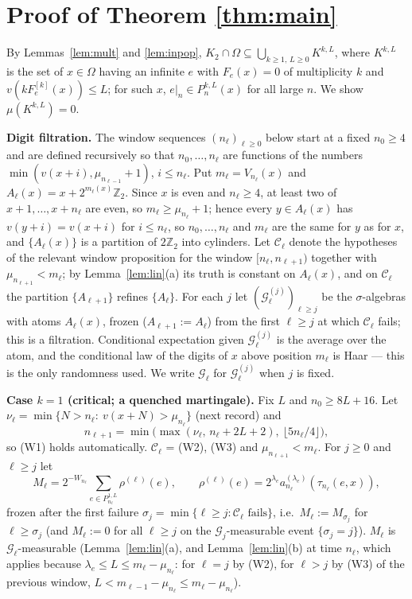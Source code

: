 \documentclass[11pt]{amsart}
\theoremstyle{definition}
\newcommand{\Z}{\mathbb Z}
\begin{document}
\section{Proof of Theorem \ref{thm:main}}
By Lemmas~\ref{lem:mult} and \ref{lem:inpop}, $K_2\cap\Omega\subseteq\bigcup_{k\ge1,\,L\ge0}K^{k,L}$, where $K^{k,L}$ is the set of
$x\in\Omega$ having an infinite $e$ with $F_e(x)=0$ of multiplicity $k$ and $v(kF^{[k]}_e(x))\le L$; for such $x$,
$e|_n\in P^{k,L}_n(x)$ for all large $n$. We show $\mu(K^{k,L})=0$.

\medskip\noindent\textbf{Digit filtration.} The window sequences $(n_\ell)_{\ell\ge0}$ below start at a fixed $n_0\ge4$ and are defined
recursively so that $n_0,\dots,n_\ell$ are functions of the numbers $\min(v(x+i),\mu_{n_{\ell-1}}+1)$, $i\le n_\ell$. Put $m_\ell=V_{n_\ell}(x)$
and $A_\ell(x)=x+2^{m_\ell(x)}\Z_2$. Since $x$ is even and $n_\ell\ge4$, at least two of $x+1,\dots,x+n_\ell$ are even, so
$m_\ell\ge\mu_{n_\ell}+1$; hence every $y\in A_\ell(x)$ has $v(y+i)=v(x+i)$ for $i\le n_\ell$, so $n_0,\dots,n_\ell$ and $m_\ell$ are the same
for $y$ as for $x$, and $\{A_\ell(x)\}$ is a partition of $2\Z_2$ into cylinders. Let $\mathcal C_\ell$ denote the hypotheses of the
relevant window proposition for the window $[n_\ell,n_{\ell+1})$ together with $\mu_{n_{\ell+1}}<m_\ell$; by Lemma~\ref{lem:lin}(a) its truth
is constant on $A_\ell(x)$, and on $\mathcal C_\ell$ the partition $\{A_{\ell+1}\}$ refines $\{A_\ell\}$. For each $j$ let
$(\mathcal G^{(j)}_\ell)_{\ell\ge j}$ be the $\sigma$-algebras with atoms $A_\ell(x)$, frozen ($A_{\ell+1}:=A_\ell$) from the first
$\ell\ge j$ at which $\mathcal C_\ell$ fails; this is a filtration. Conditional expectation given $\mathcal G^{(j)}_\ell$ is the average over the atom,
and the conditional law of the digits of $x$ above position $m_\ell$ is Haar --- this is the only randomness used.
We write $\mathcal G_\ell$ for $\mathcal G^{(j)}_\ell$ when $j$ is fixed.

\medskip\noindent\textbf{Case $k=1$ (critical; a quenched martingale).} Fix $L$ and $n_0\ge8L+16$. Let
$\nu_\ell=\min\{N>n_\ell:\ v(x+N)>\mu_{n_\ell}\}$ (next record) and
\[ n_{\ell+1}=\min\big(\max(\nu_\ell,\,n_\ell+2L+2),\ \lfloor5n_\ell/4\rfloor\big), \]
so (W1) holds automatically. $\mathcal C_\ell$ = (W2), (W3) and $\mu_{n_{\ell+1}}<m_\ell$. For $j\ge0$ and $\ell\ge j$ let
\[ M_\ell=2^{-W_{n_\ell}}\sum_{e\in P^{1,L}_{n_\ell}}\rho^{(\ell)}(e),\qquad\rho^{(\ell)}(e)=2^{\lambda_e}a^{(\lambda_e)}_{n_\ell}(\tau_{n_\ell}(e,x)), \]
frozen after the first failure $\sigma_j=\min\{\ell\ge j:\mathcal C_\ell\text{ fails}\}$, i.e.\ $M_\ell:=M_{\sigma_j}$ for $\ell\ge\sigma_j$
(and $M_\ell:=0$ for all $\ell\ge j$ on the $\mathcal G_j$-measurable event $\{\sigma_j=j\}$). $M_\ell$ is $\mathcal G_\ell$-measurable
(Lemma~\ref{lem:lin}(a), and Lemma~\ref{lem:lin}(b) at time $n_\ell$, which applies because $\lambda_e\le L\le m_\ell-\mu_{n_\ell}$: for $\ell=j$ by (W2),
for $\ell>j$ by (W3) of the previous window, $L<m_{\ell-1}-\mu_{n_\ell}\le m_\ell-\mu_{n_\ell}$).
\end{document}
